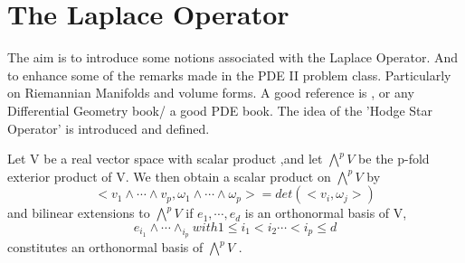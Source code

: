 \section{The Laplace Operator}
\begin{idea}
 The aim is to introduce some notions associated with the Laplace Operator. And
to enhance some of the remarks made in the PDE II problem class. Particularly on Riemannian Manifolds and volume forms.
A good reference is \cite{jost2011riemannian}, or any Differential Geometry book/ a good PDE book.
The idea of the 'Hodge Star Operator' is introduced and defined. 
\end{idea}
  Let V be a real vector space with scalar product \scal,and let $\bigwedge^{p}V$ be the p-fold exterior product
of V.
We then obtain a scalar product on $\bigwedge^{p}V$  by 
\begin{equation}\label{1}
 <v_1\wedge\cdots \wedge v_p,\omega_1\wedge \cdots \wedge \omega_p > = det(<v_i,\omega_j>)
\end{equation}
and bilinear extensions to $\bigwedge^{p}V$  if $e_1,\cdots, e_d$ is an orthonormal basis of V, 
\begin{equation}\label{2}
 e_{i_1}\wedge \cdots \wedge_{i_p} with 1 \leq i_1 \lt i_2 \cdots \lt i_p \leq d
\end{equation}
constitutes an orthonormal basis of $\bigwedge^{p}V$ .
